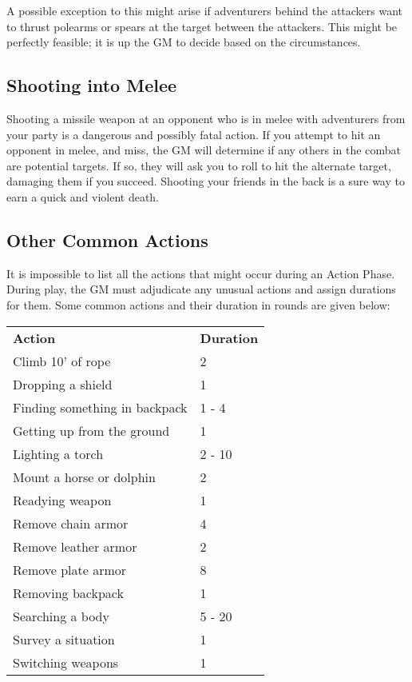 \begin{multicols*}{2}
A possible exception to this might arise if adventurers behind the attackers want to thrust polearms or spears at the target between the attackers. This might be perfectly feasible; it is up the GM to decide based on the circumstances.
\subsection{Shooting into Melee}
Shooting a missile weapon at an opponent who is in melee with adventurers from your party is a dangerous and possibly fatal action. If you attempt to hit an opponent in
melee, and miss, the GM will determine if any others in the combat are potential targets. If so, they will ask you to roll to hit the alternate target, damaging them if you succeed. Shooting your friends in the back is a sure way to earn a quick and violent death.
\subsection{Other Common Actions}
It is impossible to list all the actions that might occur during an Action Phase. During play, the GM must adjudicate any unusual actions and assign durations for them. Some common actions and their duration in rounds are given below:
\begin{tcolorbox}[breakable,boxrule=0pt,title=\textbf{Common Action Duration}]
\begin{tabular}{l l}
\textbf{Action} & \textbf{Duration}\\
Climb 10’ of rope & 2\\
Dropping a shield & 1\\
Finding something in backpack & 1 - 4\\
Getting up from the ground & 1\\
Lighting a torch & 2 - 10\\
Mount a horse or dolphin & 2\\
Readying weapon & 1\\
Remove chain armor & 4\\
Remove leather armor & 2\\
Remove plate armor & 8\\
Removing backpack & 1\\
Searching a body & 5 - 20\\
Survey a situation & 1\\
Switching weapons & 1\\
\end{tabular}
\end{tcolorbox}

\end{multicols*}
